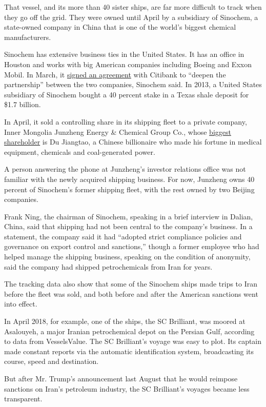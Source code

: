 That vessel, and its more than 40 sister ships, are far more difficult
to track when they go off the grid. They were owned until April by a
subsidiary of Sinochem, a state-owned company in China that is one of
the world's biggest chemical manufacturers.

Sinochem has extensive business ties in the United States. It has an
office in Houston and works with big American companies including Boeing
and Exxon Mobil. In March, it
\href{http://www.sinochem.com/en/s/1569-4171-126554.html}{signed an
agreement} with Citibank to ``deepen the partnership'' between the two
companies, Sinochem said. In 2013, a United States subsidiary of
Sinochem bought a 40 percent stake in a Texas shale deposit for \$1.7
billion.

In April, it sold a controlling share in its shipping fleet to a private
company, Inner Mongolia Junzheng Energy \& Chemical Group Co., whose
\href{http://static.sse.com.cn/disclosure/listedinfo/announcement/c/2019-04-30/601216_2019_1.pdf}{biggest
shareholder} is Du Jiangtao, a Chinese billionaire who made his fortune
in medical equipment, chemicals and coal-generated power.

A person answering the phone at Junzheng's investor relations office was
not familiar with the newly acquired shipping business. For now,
Junzheng owns 40 percent of Sinochem's former shipping fleet, with the
rest owned by two Beijing companies.

Frank Ning, the chairman of Sinochem, speaking in a brief interview in
Dalian, China, said that shipping had not been central to the company's
business. In a statement, the company said it had ``adopted strict
compliance policies and governance on export control and sanctions,''
though a former employee who had helped manage the shipping business,
speaking on the condition of anonymity, said the company had shipped
petrochemicals from Iran for years.

The tracking data also show that some of the Sinochem ships made trips
to Iran before the fleet was sold, and both before and after the
American sanctions went into effect.

In April 2018, for example, one of the ships, the SC Brilliant, was
moored at Asalouyeh, a major Iranian petrochemical depot on the Persian
Gulf, according to data from VesselsValue. The SC Brilliant's voyage was
easy to plot. Its captain made constant reports via the automatic
identification system, broadcasting its course, speed and destination.

But after Mr. Trump's announcement last August that he would reimpose
sanctions on Iran's petroleum industry, the SC Brilliant's voyages
became less transparent.


